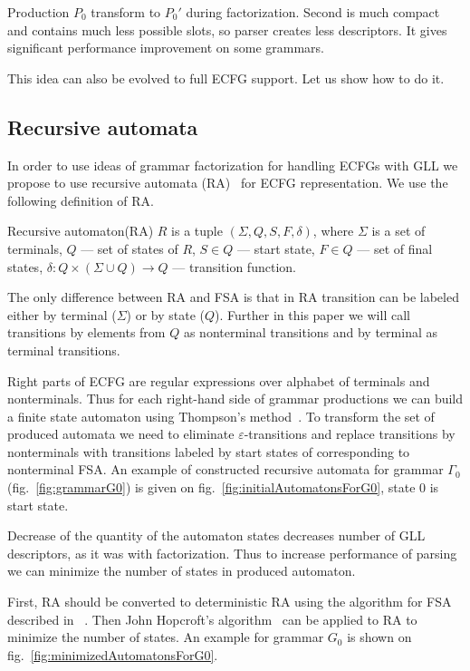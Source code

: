 \documentclass[runningheads,a4paper]{llncs}
\begin{document}
Production $P_0$ transform to $P_0'$ during factorization.
Second is much compact and contains much less possible slots, so parser creates less descriptors.
It gives significant performance improvement on some grammars.

This idea can also be evolved to full ECFG support.
Let us show how to do it.

\subsection{Recursive automata}

In order to use ideas of grammar factorization for handling ECFGs with GLL we propose to use recursive automata (RA)~\cite{tellier2006learning} for ECFG representation.
We use the following definition of RA.

\begin{mydef}
    Recursive automaton(RA) $R$ is a tuple $(\Sigma, Q, S, F, \delta)$, where
    $\Sigma$ is a set of terminals,
    $Q$ --- set of states of $R$,
    $S \in Q$ --- start state,
    $F \in Q$ --- set of final states,
    $\delta : Q \times (\Sigma \cup Q) \to Q$ --- transition function.
\end{mydef}

The only difference between RA and FSA is that in RA transition can be labeled either 
by terminal ($\Sigma$) or by state ($Q$). Further in this paper we will call
transitions by elements from $Q$ as nonterminal transitions and by terminal as terminal transitions.

Right parts of ECFG are regular expressions over alphabet of terminals and nonterminals.
Thus for each right-hand side of grammar productions we can build a finite state automaton 
using Thompson's method~\cite{Thompson:1968:PTR:363347.363387}. 
To transform the set of produced automata we need to eliminate $\varepsilon$-transitions and replace
transitions by nonterminals with transitions labeled by start states of corresponding to nonterminal FSA.
An example of constructed recursive automata for grammar $\Gamma_{0}$(fig.~\ref{fig:grammarG0})
is given on fig.~\ref{fig:initialAutomatonsForG0}, state 0 is start state.

Decrease of the quantity of the automaton states decreases number of GLL descriptors, as it was with factorization.
Thus to increase performance of parsing we can minimize the number of states in produced automaton.

First, RA should be converted to deterministic RA using the algorithm for FSA described in ~\cite{aho1974design}.
Then John Hopcroft's algorithm~\cite{hopcroft1971n} can be applied to RA to minimize the number of states.
An example for grammar $G_0$ is shown on fig.~\ref{fig:minimizedAutomatonsForG0}.
\end{document}
